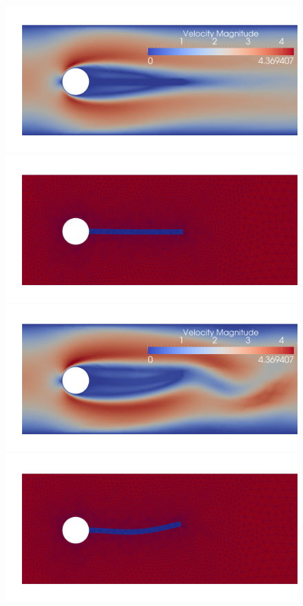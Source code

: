 \begin{figure}
  \centering
  \includegraphics[width=\largefig]{chapters/hoffman-2/png/fsi3_vel_050.png}\\
  \includegraphics[width=\largefig]{chapters/hoffman-2/png/fsi3_theta_050.png}\\
  \includegraphics[width=\largefig]{chapters/hoffman-2/png/fsi3_vel_250.png}\\
  \includegraphics[width=\largefig]{chapters/hoffman-2/png/fsi3_theta_250.png}

\end{figure}
